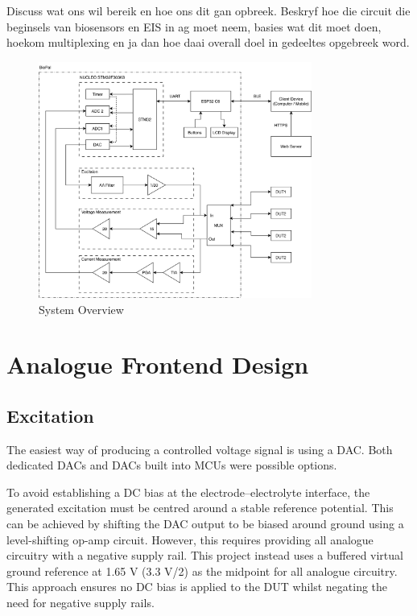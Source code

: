 Discuss wat ons wil bereik en hoe ons dit gan opbreek. Beskryf hoe die circuit die beginsels van biosensors en EIS in ag moet neem, basies wat dit moet doen, hoekom multiplexing en ja dan hoe daai overall doel in gedeeltes opgebreek word.

\begin{figure}[H]
    \centering
    \includegraphics[width=0.8\textwidth]{FullSystemOverview.png}
    \caption{System Overview}
    \label{fig:system_overview} 
\end{figure}

\section{Analogue Frontend Design}

\subsection{Excitation}\label{subsec:design_excitation}
The easiest way of producing a controlled voltage signal is using a \ac{DAC}. Both dedicated \acp{DAC} and \acp{DAC} built into \acp{MCU} were possible options.

To avoid establishing a DC bias at the electrode–electrolyte interface, the generated excitation must be centred around a stable reference potential. This can be achieved by shifting the \ac{DAC} output to be biased around ground using a level-shifting op-amp circuit. However, this requires providing all analogue circuitry with a negative supply rail. This project instead uses a buffered virtual ground reference at 1.65 V (3.3 V/2) as the midpoint for all analogue circuitry. This approach ensures no DC bias is applied to the \ac{DUT} whilst negating the need for negative supply rails.

